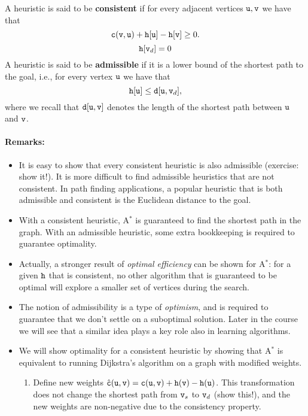 \begin{definition}
A heuristic is said to be \textbf{consistent} if for every adjacent vertices ${\tt u},{\tt v}$ we have that $${\tt c}({\tt v},{\tt u})+{\tt h}[{\tt u}]-{\tt h}[{\tt v}] \geq 0.$$
$${\tt h}[{\tt v}_d]=0$$  
A heuristic is said to be \textbf{admissible} if it is a lower bound of the shortest path to the goal, i.e., for every vertex ${\tt u}$ we have that $${\tt h}[{\tt u}] \leq {\tt d}[{\tt u},{\tt v}_d],$$
where we recall that ${\tt d}[{\tt u},{\tt v}]$ denotes the length of the shortest path between ${\tt u}$ and ${\tt v}$.
\end{definition}

\paragraph{Remarks:}
\begin{itemize}
  \item It is easy to show that every consistent heuristic is also admissible (exercise: show it!). It is more difficult to find admissible heuristics that are not consistent. In path finding applications, a popular heuristic that is both admissible and consistent is the Euclidean distance to the goal.
  \item With a consistent heuristic, A$^*$ is guaranteed to find the shortest path in the graph. With an admissible heuristic, some extra bookkeeping is required to guarantee optimality. 
  \item Actually, a stronger result of \textit{optimal efficiency} can be shown for A$^*$: for a given ${\tt h}$ that is consistent, no other algorithm that is guaranteed to be optimal will explore a smaller set of vertices during the search.
  \item The notion of admissibility is a type of \emph{optimism}, and is required to guarantee that we don't settle on a suboptimal solution. Later in the course we will see that a similar idea plays a key role also in learning algorithms. 
  \item We will show optimality for a consistent heuristic by showing that A$^*$ is equivalent to running Dijkstra's algorithm on a graph with modified weights.
  \begin{enumerate}
      \item Define new weights $\hat{{\tt c}}({\tt u},{\tt v}) = {\tt c}({\tt u},{\tt v}) + {\tt h}({\tt v}) - {\tt h}({\tt u})$. This transformation does not change the shortest path from ${\tt v}_s$ to ${\tt v}_d$ (show this!), and the new weights are non-negative due to the consistency property.

\end{enumerate}
\end{itemize}
